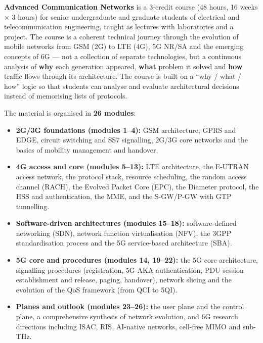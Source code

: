 
\textbf{Advanced Communication Networks} is a 3-credit course (48 hours, 16 weeks \ensuremath{\times} 3 hours) for senior undergraduate and graduate students of electrical and telecommunication engineering, taught as lectures with laboratories and a project. The course is a coherent technical journey through the evolution of mobile networks from GSM (2G) to LTE (4G), 5G NR/\allowbreak{}SA and the emerging concepts of 6G — not a collection of separate technologies, but a continuous analysis of \textbf{why} each generation appeared, \textbf{what} problem it solved and \textbf{how} traffic flows through its architecture. The course is built on a “why /\allowbreak{} what /\allowbreak{} how” logic so that students can analyse and evaluate architectural decisions instead of memorising lists of protocols.


The material is organised in \textbf{26 modules}:

\begin{itemize}
\tightlist
\item
  \textbf{2G/\allowbreak{}3G foundations (modules 1–4):} GSM architecture, GPRS and EDGE, circuit switching and SS7 signalling, 2G/\allowbreak{}3G core networks and the basics of mobility management and handover.
\item
  \textbf{4G access and core (modules 5–13):} LTE architecture, the E-UTRAN access network, the protocol stack, resource scheduling, the random access channel (RACH), the Evolved Packet Core (EPC), the Diameter protocol, the HSS and authentication, the MME, and the S-GW/\allowbreak{}P-GW with GTP tunnelling.
\item
  \textbf{Software-driven architectures (modules 15–18):} software-defined networking (SDN), network function virtualisation (NFV), the 3GPP standardisation process and the 5G service-based architecture (SBA).
\item
  \textbf{5G core and procedures (modules 14, 19–22):} the 5G core architecture, signalling procedures (registration, 5G-AKA authentication, PDU session establishment and release, paging, handover), network slicing and the evolution of the QoS framework (from QCI to 5QI).
\item
  \textbf{Planes and outlook (modules 23–26):} the user plane and the control plane, a comprehensive synthesis of network evolution, and 6G research directions including ISAC, RIS, AI-native networks, cell-free MIMO and sub-THz.
\end{itemize}

